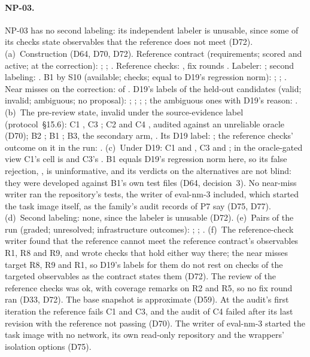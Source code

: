 \paragraph{NP-03.}
NP-03 has no second labeling: its independent labeler is unusable, since some of its checks state observables that the
reference does not meet (D72).
(a)~Construction (D64, D70, D72). Reference contract (requirements; scored and active; at the correction):
; ; . Reference checks:
, fix rounds . Labeler: ; second labeling:
. B1 by S10 (available; checks; equal to D19's regression norm): ;
; . Near misses on the correction:  of
. D19's labels of the held-out candidates (valid; invalid; ambiguous; no proposal):
; ; ; ; the ambiguous ones
with D19's reason: .
(b)~The pre-review state, invalid under the source-evidence label (protocol~\S15.6): C1 , C3
; C2  and C4 , audited against an unreliable oracle (D70); B2
; B1 ; B3, the secondary arm, . Its D19 label: ; the
reference checks' outcome on it in the run: .
(c)~Under D19: C1  and , C3  and ; in the oracle-gated
view C1's cell is  and C3's . B1 equals D19's regression norm here, so its false
rejection, , is uninformative, and its verdicts on the alternatives are not blind: they were developed
against B1's own test files (D64, decision~3). No near-miss writer ran the repository's tests, the writer of eval-nm-3
included, which started the task image itself, as the family's audit records of P7 say (D75, D77).
(d)~Second labeling: none, since the labeler is unusable (D72).
(e)~Pairs of the run (graded; unresolved; infrastructure outcomes): ; ;
.
(f)~The reference-check writer found that the reference cannot meet the reference contract's observables R1, R8 and
R9, and wrote checks that hold either way there; the near misses target R8, R9 and R1, so D19's labels for them do not
rest on checks of the targeted observables as the contract states them (D72). The review of the reference checks was
ok, with coverage remarks on R2 and R5, so no fix round ran (D33, D72). The base snapshot is approximate (D59). At the
audit's first iteration the reference fails C1 and C3, and the audit of C4 failed after its last revision with the
reference not passing (D70). The writer of eval-nm-3 started the task image with no network, its own read-only
repository and the wrappers' isolation options (D75).

